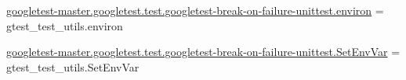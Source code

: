 \begin{DoxyCompactItemize}
\item 
\mbox{\hyperlink{namespacegoogletest-master_1_1googletest_1_1test_1_1googletest-break-on-failure-unittest_a71393e859cb92db88d7663ddcf0e929d}{googletest-\/master.\+googletest.\+test.\+googletest-\/break-\/on-\/failure-\/unittest.\+environ}} = gtest\+\_\+test\+\_\+utils.\+environ
\item 
\mbox{\hyperlink{namespacegoogletest-master_1_1googletest_1_1test_1_1googletest-break-on-failure-unittest_aeff8dd0b5955763e0c4ac7727bd55ec9}{googletest-\/master.\+googletest.\+test.\+googletest-\/break-\/on-\/failure-\/unittest.\+Set\+Env\+Var}} = gtest\+\_\+test\+\_\+utils.\+Set\+Env\+Var
\end{DoxyCompactItemize}
